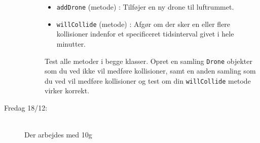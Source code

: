 \documentclass[a4paper,12pt]{article}
\begin{document}
\begin{description}
\begin{description}
\begin{itemize}
    \item \texttt{addDrone} (metode) : Tilføjer en ny drone til luftrummet.
    \item \texttt{willCollide} (metode) : Afgør om der sker en eller flere kollisioner indenfor et specificeret tidsinterval givet
      i hele minutter.
    \end{itemize}
    Test alle metoder i begge klasser. Opret en samling \texttt{Drone} objekter som du ved ikke vil medføre kollisioner, samt en anden samling som du ved vil medføre kollisioner og test om din \texttt{willCollide} metode virker korrekt.
  \end{description}
\item[Fredag 18/12:]~\\
  Der arbejdes med 10g
\end{description}
\end{document}
